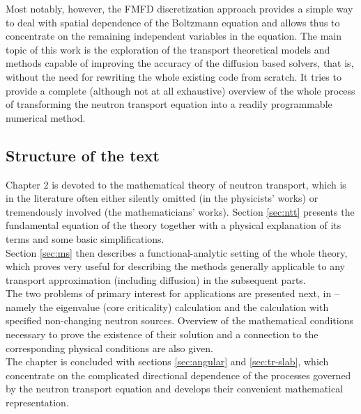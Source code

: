 Most notably, however, the FMFD discretization approach provides a simple way to deal with spatial dependence of the
Boltzmann equation and allows thus to concentrate on the remaining independent variables in the equation. The main topic
of this work is the exploration of the transport theoretical models and methods capable of improving the accuracy of the
diffusion based solvers, that is, without the need for rewriting the whole existing code from scratch. It tries to
provide a complete (although not at all exhaustive) overview of the whole process of transforming the neutron transport
equation into a readily programmable numerical method.

\subsection{Structure of the text}
Chapter 2 is devoted to the mathematical theory of neutron transport, which is in the literature often either silently
omitted (in the physicists' works) or tremendously involved (the mathematicians' works). Section \ref{sec:ntt} presents
the fundamental equation of the theory together with a physical explanation of its terms and some basic
simplifications.\\
\indent Section \ref{sec:ms} then describes a functional-analytic setting of the whole theory, which proves very useful
for describing the methods generally applicable to any transport approximation (including diffusion) in the subsequent
parts.\\
\indent The two problems of primary interest for applications are presented next, in  -- namely
the eigenvalue (core criticality) calculation and the calculation with specified non-changing neutron sources. Overview
of the mathematical conditions necessary to prove the existence of their solution and a connection to the corresponding
physical conditions are also given.\\
\indent The chapter is concluded with sections \ref{sec:angular} and \ref{sec:tr-slab}, which concentrate on the
complicated directional dependence of the processes governed by the neutron transport equation and develops their
convenient mathematical representation.

